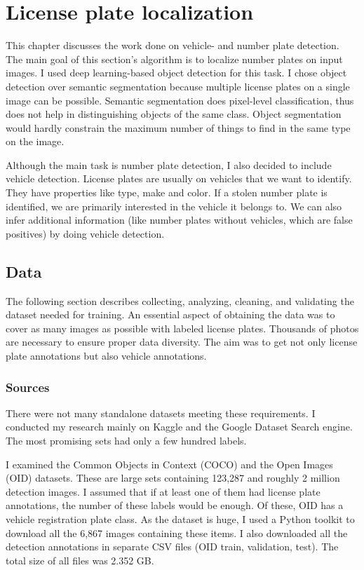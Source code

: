 \chapter{License plate localization}

This chapter discusses the work done on vehicle- and number plate detection. The main goal of this section’s algorithm is to localize number plates on input images. I used deep learning-based object detection for this task. I chose object detection over semantic segmentation because multiple license plates on a single image can be possible. Semantic segmentation does pixel-level classification, thus does not help in distinguishing objects of the same class. Object segmentation would hardly constrain the maximum number of things to find in the same type on the image.

Although the main task is number plate detection, I also decided to include vehicle detection. License plates are usually on vehicles that we want to identify. They have properties like type, make and color. If a stolen number plate is identified, we are primarily interested in the vehicle it belongs to. We can also infer additional information (like number plates without vehicles, which are false positives) by doing vehicle detection.

\section{Data}

The following section describes collecting, analyzing, cleaning, and validating the dataset needed for training. An essential aspect of obtaining the data was to cover as many images as possible with labeled license plates. Thousands of photos are necessary to ensure proper data diversity. The aim was to get not only license plate annotations but also vehicle annotations.

\subsection{Sources}

There were not many standalone datasets meeting these requirements. I conducted my research mainly on Kaggle and the Google Dataset Search engine. The most promising sets had only a few hundred labels.

I examined the Common Objects in Context\cite{MS-COCO} (COCO) and the Open Images\cite{OID} (OID) datasets. These are large sets containing 123,287 and roughly 2 million detection images. I assumed that if at least one of them had license plate annotations, the number of these labels would be enough. Of these, OID has a vehicle registration plate class. As the dataset is huge, I used a Python toolkit to download all the 6,867 images containing these items. I also downloaded all the detection annotations in separate CSV files (OID train, validation, test). The total size of all files was 2.352 GB.

